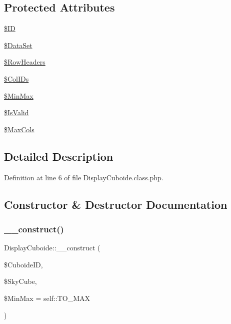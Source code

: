 \subsection*{Protected Attributes}
\begin{DoxyCompactItemize}
\item 
\hyperlink{class_display_cuboide_a6648e1e391bde1bff4182eda3fd27a27}{\$\+ID}
\item 
\hyperlink{class_display_cuboide_a4c9e8d018d1d68b4250fbe9eb42dcc36}{\$\+Data\+Set}
\item 
\hyperlink{class_display_cuboide_a5d84a5c5342acf1f06024ea9caf5a821}{\$\+Row\+Headers}
\item 
\hyperlink{class_display_cuboide_aa8ff4a28b9da50fca3e279c8751dcd4d}{\$\+Col\+I\+Ds}
\item 
\hyperlink{class_display_cuboide_a919f27c7fc385e6f2f60949972672fa8}{\$\+Min\+Max}
\item 
\hyperlink{class_display_cuboide_a5d17f55777efb7e9d05792efb0a9ff17}{\$\+Is\+Valid}
\item 
\hyperlink{class_display_cuboide_adfffe80cf360bf0ef1eeed572023aa74}{\$\+Max\+Cols}
\end{DoxyCompactItemize}


\subsection{Detailed Description}


Definition at line 6 of file Display\+Cuboide.\+class.\+php.



\subsection{Constructor \& Destructor Documentation}
\mbox{\label{class_display_cuboide_a9e65582b70a5c17de4ce9ad3ee7f51cd}} 
\subsubsection{\texorpdfstring{\+\_\+\+\_\+construct()}{\_\_construct()}}
{\footnotesize\ttfamily Display\+Cuboide\+::\+\_\+\+\_\+construct (\begin{DoxyParamCaption}\item[{}]{\$\+Cuboide\+ID,  }\item[{}]{\$\+Sky\+Cube,  }\item[{}]{\$\+Min\+Max = {\ttfamily self\+:\+:TO\+\_\+MAX} }\end{DoxyParamCaption})}



